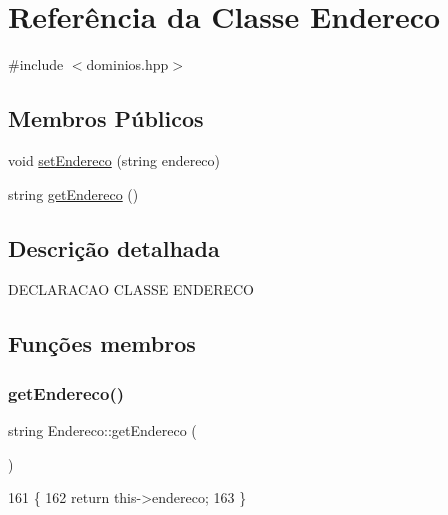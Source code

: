 \hypertarget{class_endereco}{}\section{Referência da Classe Endereco}
\label{class_endereco}


{\ttfamily \#include $<$dominios.\+hpp$>$}

\subsection*{Membros Públicos}
\begin{DoxyCompactItemize}
\item 
void \mbox{\hyperlink{class_endereco_a36e8c19c5e97f321d77aece5b3e53239}{set\+Endereco}} (string endereco)
\item 
string \mbox{\hyperlink{class_endereco_aa1ccbda52f9559a68379c54e7e914d19}{get\+Endereco}} ()
\end{DoxyCompactItemize}


\subsection{Descrição detalhada}
D\+E\+C\+L\+A\+R\+A\+C\+AO C\+L\+A\+S\+SE E\+N\+D\+E\+R\+E\+CO 

\subsection{Funções membros}
\mbox{\label{class_endereco_aa1ccbda52f9559a68379c54e7e914d19}} 
\subsubsection{\texorpdfstring{get\+Endereco()}{getEndereco()}}
{\footnotesize\ttfamily string Endereco\+::get\+Endereco (\begin{DoxyParamCaption}{ }\end{DoxyParamCaption})}


\begin{DoxyCode}
161 \{
162   \textcolor{keywordflow}{return} this->endereco;
163 \}
\end{DoxyCode}
\mbox{\label{class_endereco_a36e8c19c5e97f321d77aece5b3e53239}} 
